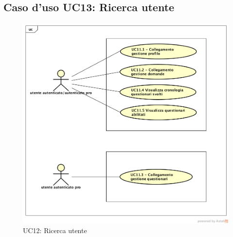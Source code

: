 \newpage
\subsection{Caso d'uso UC13: Ricerca utente}
\label{UC11}
\begin{figure}[h]
	\centering
	\includegraphics[scale=0.5]{UML/UC11.png}
	\caption{UC12: Ricerca utente}
\end{figure}